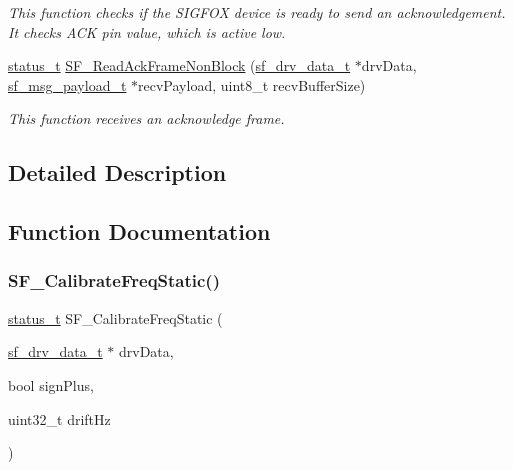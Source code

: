 \begin{DoxyCompactItemize}
\begin{DoxyCompactList}\small\item\em This function checks if the S\+I\+G\+F\+OX device is ready to send an acknowledgement. It checks A\+CK pin value, which is active low. \end{DoxyCompactList}\item 
\mbox{\hyperlink{group__ksdk__common_gaaabdaf7ee58ca7269bd4bf24efcde092}{status\+\_\+t}} \mbox{\hyperlink{group__sf__functions__group_gaea7699d331c28a9e9f708d8d859cacf5}{S\+F\+\_\+\+Read\+Ack\+Frame\+Non\+Block}} (\mbox{\hyperlink{structsf__drv__data__t}{sf\+\_\+drv\+\_\+data\+\_\+t}} $\ast$drv\+Data, \mbox{\hyperlink{structsf__msg__payload__t}{sf\+\_\+msg\+\_\+payload\+\_\+t}} $\ast$recv\+Payload, uint8\+\_\+t recv\+Buffer\+Size)
\begin{DoxyCompactList}\small\item\em This function receives an acknowledge frame. \end{DoxyCompactList}\end{DoxyCompactItemize}


\subsection{Detailed Description}


\subsection{Function Documentation}
\mbox{\label{group__sf__functions__group_ga16f222d9b0c5485b38eae13da3f5f854}} 
\subsubsection{\texorpdfstring{SF\_CalibrateFreqStatic()}{SF\_CalibrateFreqStatic()}}
{\footnotesize\ttfamily \mbox{\hyperlink{group__ksdk__common_gaaabdaf7ee58ca7269bd4bf24efcde092}{status\+\_\+t}} S\+F\+\_\+\+Calibrate\+Freq\+Static (\begin{DoxyParamCaption}\item[{\mbox{\hyperlink{structsf__drv__data__t}{sf\+\_\+drv\+\_\+data\+\_\+t}} $\ast$}]{drv\+Data,  }\item[{bool}]{sign\+Plus,  }\item[{uint32\+\_\+t}]{drift\+Hz }\end{DoxyParamCaption})}



